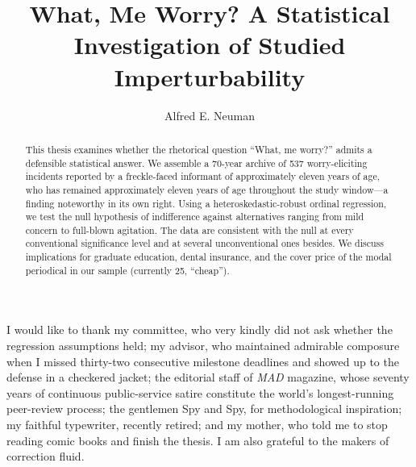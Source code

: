\documentclass{cpthesis}
\begin{document}
\title{What, Me Worry? A Statistical Investigation of Studied Imperturbability}
\author{Alfred E. Neuman}

\maketitle

\begin{frontmatter}
\copyrightpage
\committeemembershippage

\begin{abstract}
This thesis examines whether the rhetorical question ``What, me worry?''
admits a defensible statistical answer. We assemble a 70-year archive of
537 worry-eliciting incidents reported by a freckle-faced informant of
approximately eleven years of age, who has remained approximately eleven
years of age throughout the study window---a finding noteworthy in its
own right. Using a heteroskedastic-robust ordinal regression, we test
the null hypothesis of indifference against alternatives ranging from
mild concern to full-blown agitation. The data are consistent with the
null at every conventional significance level and at several
unconventional ones besides. We discuss implications for graduate
education, dental insurance, and the cover price of the modal periodical
in our sample (currently 25\textcent, ``cheap'').

\end{abstract}

\begin{acknowledgements}
I would like to thank my committee, who very kindly did not ask whether
the regression assumptions held; my advisor, who maintained admirable
composure when I missed thirty-two consecutive milestone deadlines and
showed up to the defense in a checkered jacket; the editorial staff of
\textit{MAD} magazine, whose seventy years of continuous public-service
satire constitute the world's longest-running peer-review process; the
gentlemen Spy and Spy, for methodological inspiration; my faithful
typewriter, recently retired; and my mother, who told me to stop reading
comic books and finish the thesis. I am also grateful to the makers of
correction fluid.
\end{acknowledgements}

\tableofcontents
\listoftables
\listoffigures
{}

\end{frontmatter}
\end{document}
